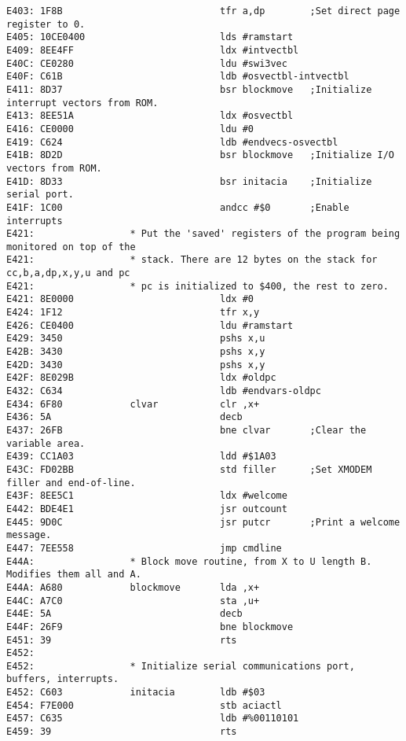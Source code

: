 {\begin{verbatim}
E403: 1F8B                            tfr a,dp        ;Set direct page register to 0.
E405: 10CE0400                        lds #ramstart
E409: 8EE4FF                          ldx #intvectbl
E40C: CE0280                          ldu #swi3vec
E40F: C61B                            ldb #osvectbl-intvectbl
E411: 8D37                            bsr blockmove   ;Initialize interrupt vectors from ROM.
E413: 8EE51A                          ldx #osvectbl
E416: CE0000                          ldu #0
E419: C624                            ldb #endvecs-osvectbl
E41B: 8D2D                            bsr blockmove   ;Initialize I/O vectors from ROM.
E41D: 8D33                            bsr initacia    ;Initialize serial port.
E41F: 1C00                            andcc #$0       ;Enable interrupts
E421:                 * Put the 'saved' registers of the program being monitored on top of the
E421:                 * stack. There are 12 bytes on the stack for cc,b,a,dp,x,y,u and pc
E421:                 * pc is initialized to $400, the rest to zero.
E421: 8E0000                          ldx #0          
E424: 1F12                            tfr x,y
E426: CE0400                          ldu #ramstart
E429: 3450                            pshs x,u
E42B: 3430                            pshs x,y
E42D: 3430                            pshs x,y  
E42F: 8E029B                          ldx #oldpc
E432: C634                            ldb #endvars-oldpc
E434: 6F80            clvar           clr ,x+
E436: 5A                              decb
E437: 26FB                            bne clvar       ;Clear the variable area.       
E439: CC1A03                          ldd #$1A03      
E43C: FD02BB                          std filler      ;Set XMODEM filler and end-of-line.
E43F: 8EE5C1                          ldx #welcome
E442: BDE4E1                          jsr outcount
E445: 9D0C                            jsr putcr       ;Print a welcome message.      
E447: 7EE558                          jmp cmdline
E44A:                 * Block move routine, from X to U length B. Modifies them all and A. 
E44A: A680            blockmove       lda ,x+
E44C: A7C0                            sta ,u+
E44E: 5A                              decb
E44F: 26F9                            bne blockmove
E451: 39                              rts
E452:                 
E452:                 * Initialize serial communications port, buffers, interrupts.
E452: C603            initacia        ldb #$03
E454: F7E000                          stb aciactl
E457: C635                            ldb #%00110101
E459: 39                              rts

\end{verbatim}}
